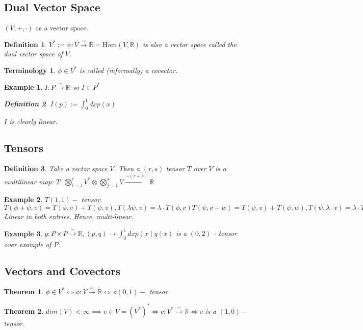\documentclass[10pt, oneside]{article}
\newcommand{\R}{\mathbb{R}}
\newtheorem{thm}{Theorem}
\newtheorem{defn}{Definition}
\newtheorem{example}{Example}
\newtheorem{Terminology}{Terminology}
\begin{document}
     \subsection*{Dual Vector Space}
        $(V,+,\cdot)$ as a vector space.
        \begin{defn}
           $V^* := {\psi: V \xrightarrow{\sim} \R} = \text{Hom} (V,\R)$ is also a vector space called the dual vector space of $V$.
        \end{defn}
        \begin{Terminology}
           $\phi \in V^*$ is called (informally) a covector.
        \end{Terminology}
        \begin{example}
        $I: P \xrightarrow{\sim} \R$ so $I \in P^*$
        \begin{defn}
           $I(p) := \int_{0}^{1}dxp(x)$
        \end{defn}
        $I$ is clearly linear.
        \end{example}
     \subsection*{Tensors}
     \begin{defn}
        Take a vector space $V$. Then a $(r,s)$ tensor $T$ over $V$ is a multilinear map: $T: \bigotimes_{i=1}^{r} V^* \otimes \bigotimes_{j=1}^{s} V \xrightarrow{\sim (r+s)} \R$
     \end{defn}
     \begin{example}
        $T (1,1) - $ tensor. $T(\phi+\psi,v) = T(\phi,v)+T(\psi,v), T(\lambda \psi,v)=\lambda\cdot T(\phi,v) T(\psi,v+w)=T(\psi,v)+T(\psi,w), T(\psi,\lambda\cdot v)= \lambda \cdot T(\psi,v)$ Linear in both entries. Hence, multi-linear.
     \end{example}
     \begin{example}
        $g: P \times P \xrightarrow{\sim} \R, (p,q) \rightarrow \int_{0}^{1}dx p(x) q(x)$ is a $(0,2)$ - tensor over example of $P$.
     \end{example}
     \subsection*{Vectors and Covectors}
        \begin{thm}
           $\phi \in V^* \iff \phi: V \xrightarrow{\sim} \R \iff \phi(0,1) - $ tensor.
        \end{thm}
        \begin{thm}
           $dim(V) < \infty \implies v \in V = (V^*)^* \iff v: V^* \xrightarrow{\sim} \R \iff v$ is a $(1,0) -$ tensor.
        \end{thm}
\end{document}
